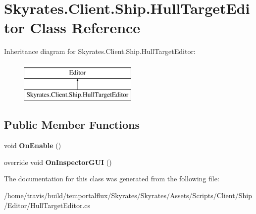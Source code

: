 \hypertarget{class_skyrates_1_1_client_1_1_ship_1_1_hull_target_editor}{\section{Skyrates.\-Client.\-Ship.\-Hull\-Target\-Editor Class Reference}
\label{class_skyrates_1_1_client_1_1_ship_1_1_hull_target_editor}
}
Inheritance diagram for Skyrates.\-Client.\-Ship.\-Hull\-Target\-Editor\-:\begin{figure}[H]
\begin{center}
\leavevmode
\includegraphics[height=2.000000cm]{class_skyrates_1_1_client_1_1_ship_1_1_hull_target_editor}
\end{center}
\end{figure}
\subsection*{Public Member Functions}
\begin{DoxyCompactItemize}
\item 
\hypertarget{class_skyrates_1_1_client_1_1_ship_1_1_hull_target_editor_aaf478ae170f0fd99ccd48b40cbc3eafe}{void {\bfseries On\-Enable} ()}\label{class_skyrates_1_1_client_1_1_ship_1_1_hull_target_editor_aaf478ae170f0fd99ccd48b40cbc3eafe}

\item 
\hypertarget{class_skyrates_1_1_client_1_1_ship_1_1_hull_target_editor_a861f0a4dc8adfd10b4d6ef63c98564cd}{override void {\bfseries On\-Inspector\-G\-U\-I} ()}\label{class_skyrates_1_1_client_1_1_ship_1_1_hull_target_editor_a861f0a4dc8adfd10b4d6ef63c98564cd}

\end{DoxyCompactItemize}


The documentation for this class was generated from the following file\-:\begin{DoxyCompactItemize}
\item 
/home/travis/build/temportalflux/\-Skyrates/\-Skyrates/\-Assets/\-Scripts/\-Client/\-Ship/\-Editor/Hull\-Target\-Editor.\-cs\end{DoxyCompactItemize}
